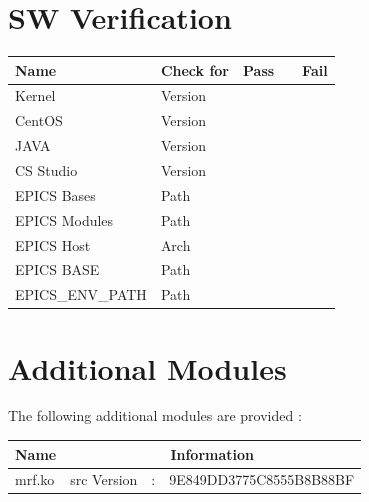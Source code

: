 \documentclass[11pt
  , a4paper
  , article
  , oneside
  , showtrims
]{memoir}
\begin{document}
\section{SW Verification}
\begin{table}[!hb]
	\centering
	\begin{tabular}{p{} p{} p{} p{} p{}}\rowcolor{gray!10}
		Name            & Check for & \multicolumn{1}{c}{Pass} & & \multicolumn{1}{c}{Fail} \\\hline
		Kernel          & Version   & \multicolumn{1}{c}{\checkbox} & & \multicolumn{1}{c}{\checkbox} \\
		CentOS          & Version   & \multicolumn{1}{c}{\checkbox} & & \multicolumn{1}{c}{\checkbox} \\
		JAVA            & Version   & \multicolumn{1}{c}{\checkbox} & & \multicolumn{1}{c}{\checkbox} \\
		CS Studio       & Version   & \multicolumn{1}{c}{\checkbox} & & \multicolumn{1}{c}{\checkbox} \\
		EPICS Bases     & Path      & \multicolumn{1}{c}{\checkbox} & & \multicolumn{1}{c}{\checkbox} \\
		EPICS Modules   & Path      & \multicolumn{1}{c}{\checkbox} & & \multicolumn{1}{c}{\checkbox} \\
		EPICS Host      & Arch      & \multicolumn{1}{c}{\checkbox} & & \multicolumn{1}{c}{\checkbox} \\
		EPICS BASE      & Path      & \multicolumn{1}{c}{\checkbox} & & \multicolumn{1}{c}{\checkbox} \\
		EPICS\_ENV\_PATH  & Path    & \multicolumn{1}{c}{\checkbox} & & \multicolumn{1}{c}{\checkbox} \\
	\end{tabular}
\end{table}

\section{Additional Modules}
The following additional modules are provided :
\begin{table}[!hb]
	\centering
	\begin{tabular}{p{} | p{} p{} p{}}\rowcolor{gray!10}
		Name            & \multicolumn{3}{c}{Information} \\\hline
		mrf.ko          & src Version   & : & 9E849DD3775C8555B8B88BF \\\hline
	\end{tabular}
\end{table}
\end{document}
